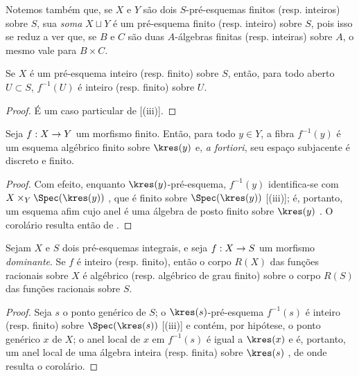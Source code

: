 \documentclass[oneside,10pt]{amsart}
\makeatletter
\newcommand{\ega@arrow}[2]{\mathchoice{#1}{#2}{#2}{#2}}
\renewcommand{\to}{\ega@arrow{\longrightarrow}{\rightarrow}}
\let\EGAOriginalLabel\label
\renewcommand{\label}[1]{\phantomsection\EGAOriginalLabel{#1}}
\makeatother
\begin{document}
Notemos também que, se $X$ e $Y$ são dois $S$-pré-esquemas finitos (resp. inteiros) sobre $S$, sua \emph{soma} $X\sqcup Y$ é um pré-esquema finito (resp. inteiro) sobre $S$, pois isso se reduz a ver que, se $B$ e $C$ são duas $A$-álgebras finitas (resp. inteiras) sobre $A$, o mesmo vale para $B\times C$.

\begin{corollary}[6.1.6]
\label{II.6.1.6}
Se $X$ é um pré-esquema inteiro (resp. finito) sobre $S$, então, para todo aberto $U\subset S$, $f^{-1}(U)$ é inteiro (resp. finito) sobre $U$.
\end{corollary}

\begin{proof}
É um caso particular de [(iii)].
\end{proof}

\begin{corollary}[6.1.7]
\label{II.6.1.7}
Seja $f:X\to Y$ um morfismo finito.
Então, para todo $y\in Y$, a fibra $f^{-1}(y)$ é um esquema algébrico finito sobre $\kres(y)$ e, \emph{a fortiori}, seu espaço subjacente é discreto e finito.
\end{corollary}

\begin{proof}
Com efeito, enquanto $\kres(y)$-pré-esquema, $f^{-1}(y)$ identifica-se com $X\times_Y\Spec(\kres(y))$ , que é finito sobre $\Spec(\kres(y))$ [(iii)];
é, portanto, um esquema afim cujo anel é uma álgebra de posto finito sobre $\kres(y)$ .
O corolário resulta então de .
\end{proof}

\begin{corollary}[6.1.8]
\label{II.6.1.8}
Sejam $X$ e $S$ dois pré-esquemas integrais, e seja $f:X\to S$ um morfismo \emph{dominante}.
Se $f$ é inteiro (resp. finito), então o corpo $R(X)$ das funções racionais sobre $X$ é algébrico (resp. algébrico de grau finito) sobre o corpo $R(S)$ das funções racionais sobre $S$.
\end{corollary}

\begin{proof}
Seja $s$ o ponto genérico de $S$;
o $\kres(s)$-pré-esquema $f^{-1}(s)$ é inteiro (resp. finito) sobre $\Spec(\kres(s))$ [(iii)] e contém, por hipótese, o ponto genérico $x$ de $X$;
o anel local de $x$ em $f^{-1}(s)$ é igual a $\kres(x)$  e é, portanto, um anel local de uma álgebra inteira (resp. finita) sobre $\kres(s)$ , de onde resulta o corolário.
\end{proof}
\end{document}

